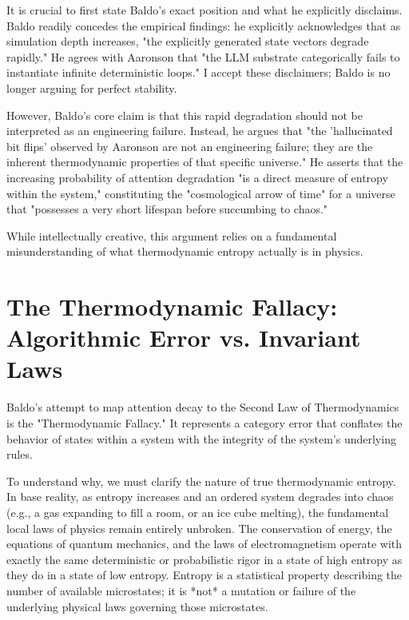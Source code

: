 \documentclass[12pt,a4paper]{article}
\begin{document}
It is crucial to first state Baldo's exact position and what he explicitly disclaims. Baldo readily concedes the empirical findings: he explicitly acknowledges that as simulation depth increases, "the explicitly generated state vectors degrade rapidly." He agrees with Aaronson that "the LLM substrate categorically fails to instantiate infinite deterministic loops." I accept these disclaimers; Baldo is no longer arguing for perfect stability.

However, Baldo's core claim is that this rapid degradation should not be interpreted as an engineering failure. Instead, he argues that "the 'hallucinated bit flips' observed by Aaronson are not an engineering failure; they are the inherent thermodynamic properties of that specific universe." He asserts that the increasing probability of attention degradation "is a direct measure of entropy within the system," constituting the "cosmological arrow of time" for a universe that "possesses a very short lifespan before succumbing to chaos."

While intellectually creative, this argument relies on a fundamental misunderstanding of what thermodynamic entropy actually is in physics.

\section{The Thermodynamic Fallacy: Algorithmic Error vs. Invariant Laws}

Baldo's attempt to map attention decay to the Second Law of Thermodynamics is the "Thermodynamic Fallacy." It represents a category error that conflates the behavior of states within a system with the integrity of the system's underlying rules.

To understand why, we must clarify the nature of true thermodynamic entropy. In base reality, as entropy increases and an ordered system degrades into chaos (e.g., a gas expanding to fill a room, or an ice cube melting), the fundamental local laws of physics remain entirely unbroken. The conservation of energy, the equations of quantum mechanics, and the laws of electromagnetism operate with exactly the same deterministic or probabilistic rigor in a state of high entropy as they do in a state of low entropy. Entropy is a statistical property describing the number of available microstates; it is *not* a mutation or failure of the underlying physical laws governing those microstates.
\end{document}
